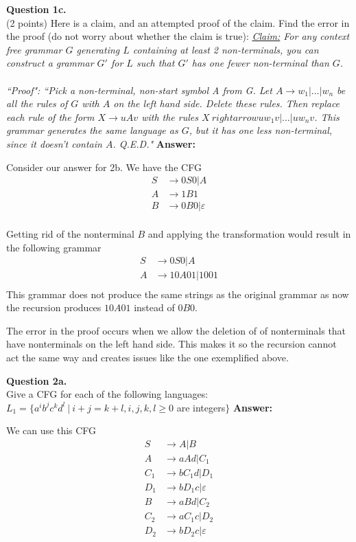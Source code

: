 \documentclass{article}
\renewcommand{\epsilon}{\varepsilon}
\newenvironment{question}[2]
{
    {\large \textbf{Question #1.}}\\
    #2 \newline\newline
    \textbf{Answer:}
}{}{\newpage}
\begin{document}
\begin{question}
    {1c}
    {(2 points) Here is a claim, and an attempted proof of the claim. Find the
        error in the proof (do not worry about whether the claim is true):
        \textit{\underline{Claim:} For any context free grammar $G$ generating $L$
            containing at least 2 non-terminals, you can construct a grammar $G'$ for $L$ such
            that $G'$ has one fewer non-terminal than $G$. \\\\
            ``Proof": ``Pick a non-terminal, non-start symbol A from G. Let $A \rightarrow w_1
                | ... | w_n$ be all the rules of $G$ with $A$ on the left hand side. Delete these
            rules. Then replace each rule of the form $X \rightarrow uAv$ with the rules $X \
                rightarrow uw_1v | ... | uw_nv$.  This grammar generates the same language as $G$,
            but it has one less non-terminal, since it doesn't contain $A$. Q.E.D." }}

    Consider our answer for 2b. We have the CFG
    \begin{align*}
        S & \to 0S0|A        \\
        A & \to 1B1          \\
        B & \to 0B0|\epsilon \\
    \end{align*}

    Getting rid of the nonterminal $B$ and applying the transformation would result in the following grammar
    \begin{align*}
        S & \to 0S0|A      \\
        A & \to 10A01|1001 \\
    \end{align*}
    This grammar does not produce the same strings as the original grammar as now the recursion produces $10A01$ instead of
    $0B0$.

    The error in the proof occurs when we allow the deletion of of nonterminals that have nonterminals on the left hand side.
    This makes it so the recursion cannot act the same way and creates issues like the one exemplified above.

\end{question}

\begin{question}
    {2a}
    {Give a CFG for each of the following languages: $L_1 = \{a^ib^jc^kd^l\ |\ i+j = k+l, i,j,k,l \geq 0$ are
        integers$\}$}

    We can use this CFG
    \begin{align*}
        S   & \to A | B          \\
        A   & \to aAd | C_1      \\
        C_1 & \to  bC_1d | D_1   \\
        D_1 & \to bD_1c|\epsilon \\
        B   & \to aBd | C_2      \\
        C_2 & \to  aC_1c | D_2   \\
        D_2 & \to bD_2c|\epsilon \\
    \end{align*}
\end{question}
\end{document}
